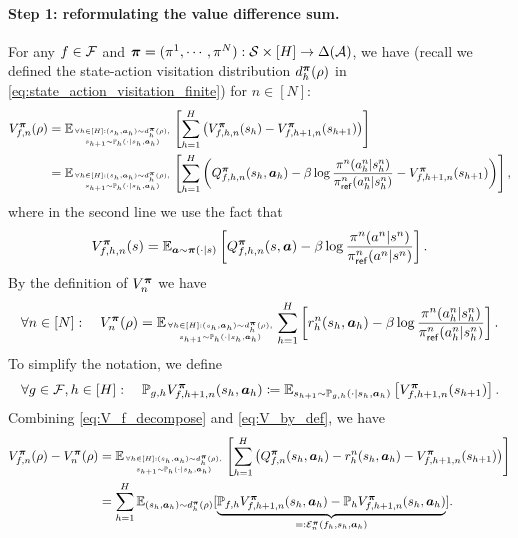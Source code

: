 \paragraph{Step 1: reformulating the value difference sum.}
    For any $f\in{\mathcal{F}}$ and ${\bm{\pi}}=(\pi^1,\cdots,\pi^N):{\mathcal{S}}\times[H]\rightarrow\Delta({\mathcal{A}})$, we have (recall we defined the state-action visitation distribution  $d_h^{\bm{\pi}}(\rho)$ in \eqref{eq:state_action_visitation_finite}) for $n\in[N]$:
    \begin{align}\label{eq:V_f_decompose}
     V_{f,n}^{{\bm{\pi}}}(\rho) &= \mathbb{E}_{\forall h\in[H]:(s_h,{\bm{a}}_h)\sim d_h^{\bm{\pi}}(\rho),\atop s_{h+1}\sim{\mathbb P}_h(\cdot|s_h,{\bm{a}}_h)}\left[\sum_{h=1}^H\left(V_{f,h,n}^{{\bm{\pi}}}(s_h)-V_{f,h+1,n}^{{\bm{\pi}}}(s_{h+1})\right)\right]\notag\\
        &=\mathbb{E}_{\forall h\in[H]:(s_h,{\bm{a}}_h)\sim d_h^{\bm{\pi}}(\rho),\atop s_{h+1}\sim{\mathbb P}_h(\cdot|s_h,{\bm{a}}_h)}\left[\sum_{h=1}^H\left(Q_{f,h,n}^{{\bm{\pi}}}(s_h,{\bm{a}}_h)-\beta\log\frac{\pi^n(a_h^n|s_h^n)}{\pi_{\mathsf{ref}}^n(a_h^n|s_h^n)} - V_{f,h+1,n}^{\bm{\pi}}(s_{h+1})\right)\right],
    \end{align}
    where in the second line we use the fact that
    $$V_{f,h,n}^{\bm{\pi}} (s)=\mathbb{E}_{{\bm{a}}\sim{\bm{\pi}}(\cdot|s)}\left[Q_{f,h,n}^{\bm{\pi}}(s,{\bm{a}})-\beta\log\frac{\pi^n(a^n|s^n)}{\pi_{\mathsf{ref}}^n(a^n|s^n)}\right].$$
    By the definition of $V_{n}^{{\bm{\pi}}}$ we have
    \begin{align}\label{eq:V_by_def}
        \forall n\in[N]:\quad V_n^{{\bm{\pi}}}(\rho) = \mathbb{E}_{\forall h\in[H]:(s_h,{\bm{a}}_h)\sim d_h^{\bm{\pi}}(\rho),\atop s_{h+1}\sim{\mathbb P}_h(\cdot|s_h,{\bm{a}}_h)}\sum_{h=1}^H\left[r_h^n(s_h,{\bm{a}}_h)-\beta\log\frac{\pi^n(a_h^n|s_h^n)}{\pi_{\mathsf{ref}}^n(a_h^n|s_h^n)}\right].
    \end{align}
    To simplify the notation, we define
    \begin{align}\label{eq:Ppushforward}
        \forall g\in{\mathcal{F}},h\in[H]:\quad{\mathbb P}_{g,h} V_{f,h+1,n}^{{\bm{\pi}}}(s_h,{\bm{a}}_h)\coloneqq \mathbb{E}_{s_{h+1}\sim{\mathbb P}_{g,h}(\cdot|s_h,{\bm{a}}_h)}\left[V_{f,h+1,n}^{{\bm{\pi}}}(s_{h+1})\right].
    \end{align}
    Combining \eqref{eq:V_f_decompose} and \eqref{eq:V_by_def}, we have
    \begin{align}
        V_{f,n}^{{\bm{\pi}}}(\rho) - V_{n}^{{\bm{\pi}}}(\rho) &= \mathbb{E}_{\forall h\in[H]:(s_h,{\bm{a}}_h)\sim d_h^{\bm{\pi}}(\rho),\atop s_{h+1}\sim{\mathbb P}_h(\cdot|s_h,{\bm{a}}_h)}\left[\sum_{h=1}^H \left( Q_{f,n}^{{\bm{\pi}}}(s_h,{\bm{a}}_h) - r_h^n(s_h,{\bm{a}}_h) -  V_{f,h+1,n}^{\bm{\pi}}(s_{h+1})\right)\right]\notag\\
    &= \sum_{h=1}^H\mathbb{E}_{(s_h,{\bm{a}}_h)\sim d_h^{\bm{\pi}}(\rho)}[\underbrace{{\mathbb P}_{f,h} V_{f,h+1,n}^{\bm{\pi}}(s_h,{\bm{a}}_h) - {\mathbb P}_h V_{f,h+1,n}^{\bm{\pi}}(s_h,{\bm{a}}_h)}_{ =: {\mathcal{E}}_n^{\bm{\pi}}(f_h,s_h,{\bm{a}}_h)}].
    \end{align}

